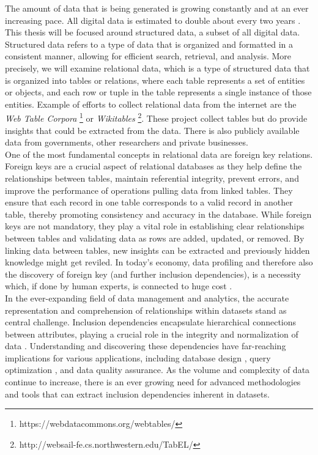The amount of data that is being generated is growing constantly and at an ever increasing pace. All digital data is estimated to double about every two years \cite{gantz2012digital}. This thesis will be focused around structured data, a subset of all digital data. Structured data refers to a type of data that is organized and formatted in a consistent manner, allowing for efficient search, retrieval, and analysis. More precisely, we will examine relational data, which is a type of structured data that is organized into tables or relations, where each table represents a set of entities or objects, and each row or tuple in the table represents a single instance of those entities. Example of efforts to collect relational data from the internet are the \textit{Web Table Corpora} \footnote{https://webdatacommons.org/webtables/} or \textit{Wikitables} \footnote{http://websail-fe.cs.northwestern.edu/TabEL/}. These project collect tables but do provide insights that could be extracted from the data. There is also publicly available data from governments, other researchers and private businesses.\\

\noindent One of the most fundamental concepts in relational data are foreign key relations\cite{casanova1982inclusion}. Foreign keys are a crucial aspect of relational databases as they help define the relationships between tables, maintain referential integrity, prevent errors, and improve the performance of operations pulling data from linked tables. They ensure that each record in one table corresponds to a valid record in another table, thereby promoting consistency and accuracy in the database. While foreign keys are not mandatory, they play a vital role in establishing clear relationships between tables and validating data as rows are added, updated, or removed. By linking data between tables, new insights can be extracted and previously hidden knowledge might get reviled. In today's economy, data profiling and therefore also the discovery of foreign key (and further inclusion dependencies), is a necessity which, if done by human experts, is connected to huge cost \cite{halevy2006data}.\\

\noindent In the ever-expanding field of data management and analytics, the accurate representation and comprehension of relationships within datasets stand as central challenge. Inclusion dependencies encapsulate hierarchical connections between attributes, playing a crucial role in the integrity and normalization of data \cite{casanova1982inclusion}. Understanding and discovering these dependencies have far-reaching implications for various applications, including database design \cite{levene2000justification}, query optimization \cite{gryz1998query}, and data quality assurance. As the volume and complexity of data continue to increase, there is an ever growing need for advanced methodologies and tools that can extract inclusion dependencies inherent in datasets. \\

